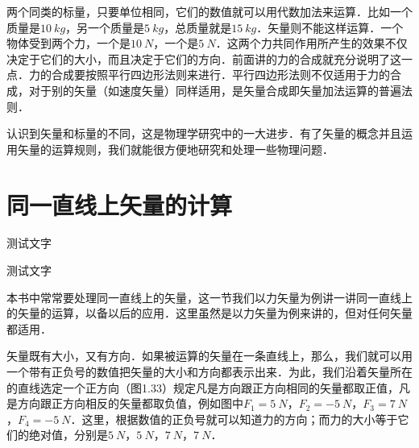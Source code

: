 两个同类的标量，只要单位相同，它们的数值就可以用代数加法来运算．比如一个质量是$\qty{10}{kg}$，另一个质量是$\qty{5}{kg}$，总质量就是$\qty{15}{kg}$．矢量则不能这样运算．一个物体受到两个力，一个是$\qty{10}{N}$，一个是$\qty{5}{N}$．这两个力共同作用所产生的效果不仅决定于它们的大小，而且决定于它们的方向．前面讲的力的合成就充分说明了这一点．力的合成要按照平行四边形法则来进行．平行四边形法则不仅适用于力的合成，对于别的矢量（如速度矢量）同样适用，是矢量合成即矢量加法运算的普遍法则．

认识到矢量和标量的不同，这是物理学研究中的一大进步．有了矢量的概念并且运用矢量的运算规则，我们就能很方便地研究和处理一些物理问题．





\section{同一直线上矢量的计算}

\begin{Point*}
	测试文字
\end{Point*}

\begin{Case*}
	\item 测试文字
\end{Case*}

本书中常常要处理同一直线上的矢量，这一节我们以力矢量为例讲一讲同一直线上的矢量的运算，以备以后的应用．这里虽然是以力矢量为例来讲的，但对任何矢量都适用．

矢量既有大小，又有方向．如果被运算的矢量在一条直线上，那么，我们就可以用一个带有正负号的数值把矢量的大小和方向都表示出来．为此，我们沿着矢量所在的直线选定一个正方向（图1.33）规定凡是方向跟正方向相同的矢量都取正值，凡是方向跟正方向相反的矢量都取负值，例如图中$F_1=\qty{5}{N}$，$F_2=-\qty{5}{N}$，$F_3=\qty{7}{N}$，$F_4=-\qty{5}{N}$．这里，根据数值的正负号就可以知道力的方向；而力的大小等于它们的绝对值，分别是$\qty{5}{N}$，$\qty{5}{N}$，$\qty{7}{N}$，$\qty{7}{N}$．
\begin{figure}[H]
    \centering
    \caption{}
\end{figure}

